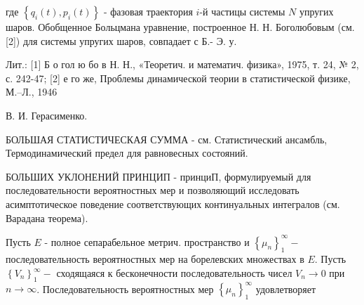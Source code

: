 \documentclass[10pt]{article}
\begin{document}
где $\left\{q_{i}(t), p_{i}(t)\right\}$ - фазовая траектория $i$-й частицы системы $N$ упругих шаров. Обобщенное Больцмана уравнение, построенное Н. Н. Боголюбовым (см. [2]) для системы упругих шаров, совпадает с Б.- Э. у.



Лит.: [1] Б о гол ю бо в Н. Н., «Теоретич. и математич. физика», 1975, т. 24, № 2, с. 242-47; [2] е го же, Проблемы динамической теории в статистической физике, М.--Л., 1946



В. И. Герасименко.



БОЛЬШАЯ СТАТИСТИЧЕСКАЯ СУММА - см. Статистический ансамбль, Термодинамический предел для равновесных состояний.



БОЛЬШИХ УКЛОНЕНИЙ ПРИНЦИП - принциП, формулируемый для последовательности вероятностных мер и позволяющий исследовать асимптотическое поведение соответствующих континуальных интегралов (см. Варадана теорема).



Пусть $E$ - полное сепарабельное метрич. пространство и $\left\{\mu_{n}\right\}_{1}^{\infty}-$ последовательность вероятностных мер на борелевских множествах в $E$. Пусть $\left\{V_{n}\right\}_{1}^{\infty}-$ сходящаяся к бесконечности последовательность чисел $V_{n} \rightarrow 0$ при $n \rightarrow \infty$. Последовательность вероятностных мер $\left\{\mu_{n}\right\}_{1}^{\infty}$ удовлетворяет
\end{document}
